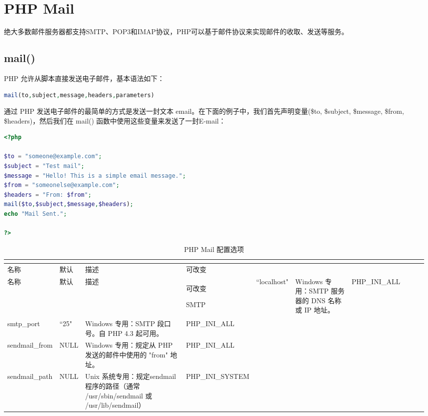 \chapter{PHP Mail}





绝大多数邮件服务器都支持SMTP、POP3和IMAP协议，PHP可以基于邮件协议来实现邮件的收取、发送等服务。




\section{mail()}


PHP 允许从脚本直接发送电子邮件，基本语法如下：

\begin{lstlisting}[language=PHP]
mail(to,subject,message,headers,parameters)
\end{lstlisting}




通过 PHP 发送电子邮件的最简单的方式是发送一封文本 email。在下面的例子中，我们首先声明变量(\$to, \$subject, \$message, \$from, \$headers)，然后我们在 mail() 函数中使用这些变量来发送了一封E-mail：

\begin{lstlisting}[language=PHP]
<?php

$to = "someone@example.com";
$subject = "Test mail";
$message = "Hello! This is a simple email message.";
$from = "someonelse@example.com";
$headers = "From: $from";
mail($to,$subject,$message,$headers);
echo "Mail Sent.";

?>
\end{lstlisting}


\begin{longtable}{|m{60pt}|m{45pt}|m{190pt}|m{80pt}|}
\tabularnewline\hline
名称	&默认	&描述	&可改变
\endhead

\caption{PHP Mail 配置选项}\\
\hline
名称	&默认	&描述	&可改变
\endfirsthead

\endfoot

\endlastfoot

\hline
SMTP			&``localhost"	&Windows 专用：SMTP 服务器的 DNS 名称或 IP 地址。	&PHP\_INI\_ALL\\
\hline
smtp\_port		&``25"			&Windows 专用：SMTP 段口号。自 PHP 4.3 起可用。&PHP\_INI\_ALL\\
\hline
sendmail\_from	&NULL			&Windows 专用：规定从 PHP 发送的邮件中使用的 "from" 地址。&PHP\_INI\_ALL\\
\hline
sendmail\_path	&	NULL		&Unix 系统专用：规定sendmail 程序的路径（通常 /usr/sbin/sendmail 或 /usr/lib/sendmail）	&PHP\_INI\_SYSTEM\\
\hline
\end{longtable}



